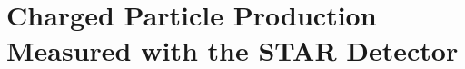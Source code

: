 \chapter{Charged Particle Production Measured with the STAR Detector}\label{chapter:star_analysis}











